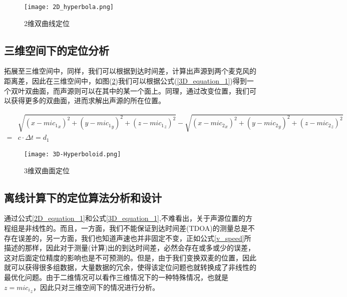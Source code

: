 \documentclass[winfonts,oneside]{njuthesis}
\begin{document}
		\begin{figure}[H]
			\centering
			\texttt{[image: 2D\_hyperbola.png]} 
			\caption{2维双曲线定位}
			\label{fig: 2D_hyperbola}
		\end{figure}		
		
		\subsection{三维空间下的定位分析}
		
		拓展至三维空间中，同样，我们可以根据到达时间差，计算出声源到两个麦克风的距离差，因此在三维空间中，如图(\ref{fig: 3D-Hyperboloid})我们可以根据公式(\ref{3D_equation_1})得到一个双叶双曲面，而声源则可以在其中的某一个面上。同理，通过改变位置，我们可以获得更多的双曲面，进而求解出声源的所在位置。
		
		\begin{equation}
		\begin{aligned}
			&\sqrt{(x-{mic_1}_x)^2+(y-{mic_1}_y)^2+(z-{mic_1}_z)^2} - \sqrt{(x-{mic_2}_x)^2+(y-{mic_2}_y)^2+(z-{mic_2}_z)^2}\\
		  = & c \cdot \Delta t= d_1 \label{3D_equation_1}
		\end{aligned}
		\end{equation}
		
		\begin{figure}[H]
			\centering
			\texttt{[image: 3D-Hyperboloid.png]} 
			\caption{3维双曲面定位}
			\label{fig: 3D-Hyperboloid}
		\end{figure}	
		
		\subsection{离线计算下的定位算法分析和设计}
		
		通过公式\ref{2D_equation_1}和公式\ref{3D_equation_1},不难看出，关于声源位置的方程组是非线性的。而且，一方面，我们不能保证到达时间差(TDOA)的测量总是不存在误差的，另一方面，我们也知道声速也并非固定不变，正如公式\ref{v_speed}所描述的那样，因此对于测量(计算)出的到达时间差，必然会存在或多或少的误差，这对后面定位精度的影响也是不可预测的。但是，由于我们变换双麦的位置，因此就可以获得很多组数据，大量数据的冗余，使得该定位问题也就转换成了非线性的最优化问题。由于二维情况可以看作三维情况下的一种特殊情况，也就是$z = {mic_i}_z$，因此只对三维空间下的情况进行分析。
		
\end{document}
